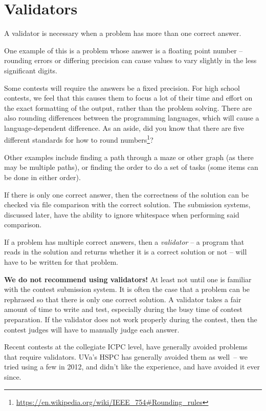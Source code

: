 \documentclass[11pt,twoside,letterpaper]{book}
\newcommand{\footurl}[1]{\footnote{\scriptsize\url{#1}}}
\begin{document}
\section{Validators}
\label{CustomValidators}

A validator is necessary when a problem has more than one correct
answer.

One example of this is a problem whose answer is a floating point
number -- rounding errors or differing precision can cause values to
vary slightly in the less significant digits.

Some contests will
require the answers be a fixed precision.  For high school contests,
we feel that this causes them to focus a lot of their time and effort
on the exact formatting of the output, rather than the problem
solving.  There are also rounding differences between the programming
languages, which will cause a language-dependent difference.  As an
aside, did you know that there are five different standards for how to
round
numbers\footurl{https://en.wikipedia.org/wiki/IEEE_754\#Rounding_rules}?

Other examples include finding a path through a maze or other graph
(as there may be multiple paths), or finding the order to do a set of
tasks (some items can be done in either order).

If there is only one correct answer, then the correctness of the
solution can be checked via file comparison with the correct solution.
The submission systems, discussed later, have the ability to ignore
whitespace when performing said comparison.

If a problem has multiple correct answers, then a {\em validator} -- a
program that reads in the solution and returns whether it is a correct
solution or not -- will have to be written for that problem.

{\bf We do not recommend using validators!} At least not until one is
familiar with the contest submission system.  It is often the case
that a problem can be rephrased so that there is only one correct
solution.  A validator takes a fair amount of time to write and test,
especially during the busy time of contest preparation.  If the
validator does not work properly during the contest, then the contest
judges will have to manually judge each answer.

Recent contests at the collegiate ICPC level, have generally avoided
problems that require validators.  UVa's HSPC has generally avoided
them as well~-- we tried using a few in 2012, and didn't like the
experience, and have avoided it ever since.
\end{document}
